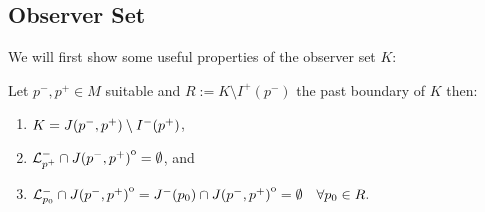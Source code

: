 \subsection{Observer Set}
We will first show some useful properties of the observer set $K$:
\begin{lemma}\label{lem:Kcharact}
    Let $p^-,p^+\in M$ suitable and $R:= K \setminus I^+(p^-)$ the past boundary of $K$ then:
    \begin{enumerate}[label={\textnormal{(\arabic*)}}]
        \item $K=J(p^-,p^+)\setminus I^-(p^+)$,
        \item ${\mathcal{L}}^-_{p^+}\cap {\kern0ptJ(p^-,p^+)}^{\mathrm{o}} = \emptyset$, and 
        \item ${\mathcal{L}}^-_{p_0} \cap {\kern0ptJ(p^-,p^+)}^{\mathrm{o}} = J^-(p_0) \cap {\kern0ptJ(p^-,p^+)}^{\mathrm{o}} = \emptyset \quad \forall p_0\in R.$
    \end{enumerate}
\end{lemma}
